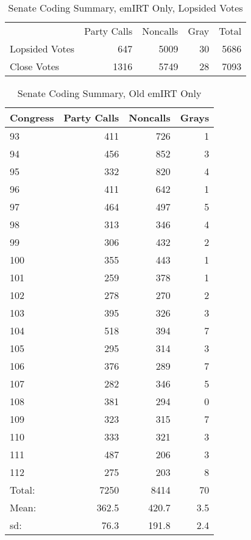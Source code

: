 \documentclass[12pt]{article}
\begin{document}
\begin{table}
	\caption{Senate Coding Summary, emIRT Only, Lopsided Votes}
	\centering
	\begin{tabular}{lrrrr}
		\hline
		& Party Calls & Noncalls & Gray & Total \\
		Lopsided Votes & 647 & 5009 & 30 & 5686 \\
		Close Votes & 1316 & 5749 & 28 & 7093 \\
		\hline
		
	\end{tabular}
\end{table}

\begin{table}[ht]
	\caption{Senate Coding Summary, Old emIRT Only}
	\centering
	\begin{tabular}{lrrr}
		\hline
		Congress & Party Calls & Noncalls & Grays \\ 
		\hline
		93 & 411 & 726 &   1 \\ 
		94 & 456 & 852 &   3 \\ 
		95 & 332 & 820 &   4 \\ 
		96 & 411 & 642 &   1 \\ 
		97 & 464 & 497 &   5 \\ 
		98 & 313 & 346 &   4 \\ 
		99 & 306 & 432 &   2 \\ 
		100 & 355 & 443 &   1 \\ 
		101 & 259 & 378 &   1 \\ 
		102 & 278 & 270 &   2 \\ 
		103 & 395 & 326 &   3 \\ 
		104 & 518 & 394 &   7 \\ 
		105 & 295 & 314 &   3 \\ 
		106 & 376 & 289 &   7 \\ 
		107 & 282 & 346 &   5 \\ 
		108 & 381 & 294 &   0 \\ 
		109 & 323 & 315 &   7 \\ 
		110 & 333 & 321 &   3 \\ 
		111 & 487 & 206 &   3 \\ 
		112 & 275 & 203 &   8 \\ 
		\hline
		Total: & 7250 & 8414 & 70 \\
		Mean: & 362.5 & 420.7 & 3.5 \\
		sd: & 76.3 & 191.8 & 2.4 \\
		\hline
	\end{tabular}
\end{table}
\end{document}
